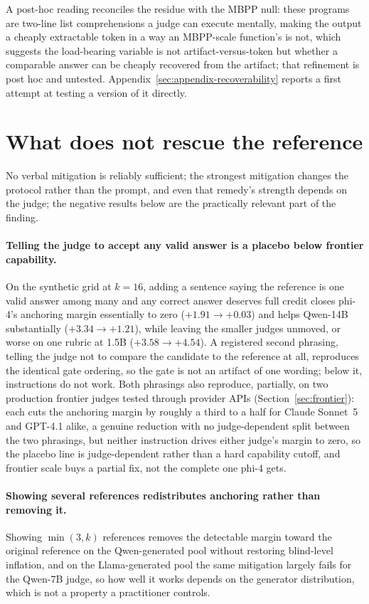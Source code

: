 \documentclass[11pt]{article}
\begin{document}
A post-hoc reading reconciles the residue with the MBPP null: these programs are two-line list comprehensions a judge can execute mentally, making the output a cheaply extractable token in a way an MBPP-scale function's is not, which suggests the load-bearing variable is not artifact-versus-token but whether a comparable answer can be cheaply recovered from the artifact; that refinement is post hoc and untested. Appendix~\ref{sec:appendix-recoverability} reports a first attempt at testing a version of it directly.

\section{What does not rescue the reference}
\label{sec:norescue}

No verbal mitigation is reliably sufficient; the strongest mitigation changes the protocol rather than the prompt, and even that remedy's strength depends on the judge; the negative results below are the practically relevant part of the finding.

\paragraph{Telling the judge to accept any valid answer is a placebo below frontier capability.}
On the synthetic grid at $k{=}16$, adding a sentence saying the reference is one valid answer among many and any correct answer deserves full credit closes phi-4's anchoring margin essentially to zero ($+1.91 \to +0.03$) and helps Qwen-14B substantially ($+3.34 \to +1.21$), while leaving the smaller judges unmoved, or worse on one rubric at 1.5B ($+3.58 \to +4.54$).
A registered second phrasing, telling the judge not to compare the candidate to the reference at all, reproduces the identical gate ordering, so the gate is not an artifact of one wording; below it, instructions do not work.
Both phrasings also reproduce, partially, on two production frontier judges tested through provider APIs (Section~\ref{sec:frontier}): each cuts the anchoring margin by roughly a third to a half for Claude Sonnet~5 and GPT-4.1 alike, a genuine reduction with no judge-dependent split between the two phrasings, but neither instruction drives either judge's margin to zero, so the placebo line is judge-dependent rather than a hard capability cutoff, and frontier scale buys a partial fix, not the complete one phi-4 gets.

\paragraph{Showing several references redistributes anchoring rather than removing it.}
Showing $\min(3,k)$ references removes the detectable margin toward the original reference on the Qwen-generated pool without restoring blind-level inflation, and on the Llama-generated pool the same mitigation largely fails for the Qwen-7B judge, so how well it works depends on the generator distribution, which is not a property a practitioner controls.
\end{document}
